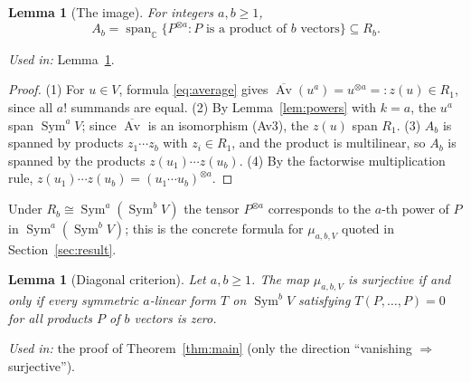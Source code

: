 \documentclass[11pt]{article}
\newtheorem{lemma}[theorem]{Lemma}
\theoremstyle{remark}
\DeclareMathOperator{\Sym}{Sym}
\DeclareMathOperator{\Av}{Av}
\newcommand{\C}{\mathbb C}
\begin{document}
\begin{lemma}[The image]\label{lem:image}
For integers $a,b\ge1$,
\[
 A_b=\operatorname{span}_{\C}
 \{P^{\otimes a}: P\text{ is a product of }b\text{ vectors}\}
 \subseteq R_b .
\]
\end{lemma}

\noindent\emph{Used in:} Lemma~\ref{lem:criterion}.

\begin{proof}
(1) For $u\in V$, formula \eqref{eq:average} gives
$\overline{\Av}(u^a)=u^{\otimes a}=:z(u)\in R_1$, since all $a!$ summands
are equal.
(2) By Lemma~\ref{lem:powers} with $k=a$, the $u^a$ span $\Sym^aV$; since
$\overline{\Av}$ is an isomorphism (Av3), the $z(u)$ span $R_1$.
(3) $A_b$ is spanned by products $z_1\cdots z_b$ with $z_i\in R_1$, and the
product is multilinear, so $A_b$ is spanned by the products
$z(u_1)\cdots z(u_b)$.
(4) By the factorwise multiplication rule,
$z(u_1)\cdots z(u_b)=(u_1\cdots u_b)^{\otimes a}$.
\end{proof}

Under $R_b\cong\Sym^a(\Sym^bV)$ the tensor $P^{\otimes a}$ corresponds to the
$a$-th power of $P$ in $\Sym^a(\Sym^bV)$; this is the concrete formula for
$\mu_{a,b,V}$ quoted in Section~\ref{sec:result}.

\begin{lemma}[Diagonal criterion]\label{lem:criterion}
Let $a,b\ge1$. The map $\mu_{a,b,V}$ is surjective if and only if every
symmetric $a$-linear form $T$ on $\Sym^b V$ satisfying $T(P,\ldots,P)=0$ for
all products $P$ of $b$ vectors is zero.
\end{lemma}

\noindent\emph{Used in:} the proof of Theorem~\ref{thm:main} (only the
direction ``vanishing $\Rightarrow$ surjective'').
\end{document}
